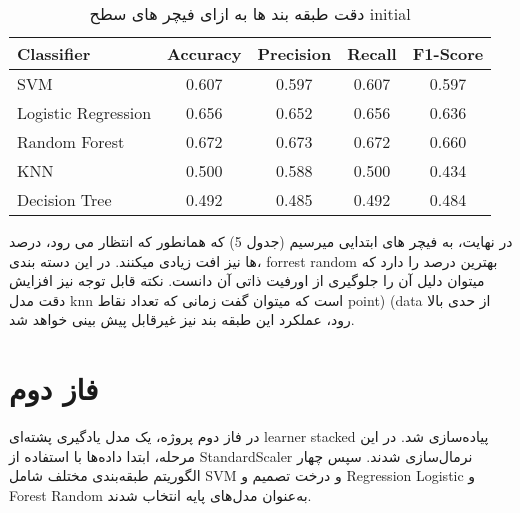 \documentclass[a4paper,12pt]{article}
\begin{document}
\begin{table}[h]
	\centering
	\begin{latin}
	\begin{tabular}{|l|c|c|c|c|}
		\hline
		\textbf{Classifier} & \textbf{Accuracy} & \textbf{Precision} & \textbf{Recall} & \textbf{F1-Score} \\
		\hline
		SVM & 0.607 & 0.597 & 0.607 & 0.597 \\
		\hline
		Logistic Regression & 0.656 & 0.652 & 0.656 & 0.636 \\
		\hline
		Random Forest & 0.672 & 0.673 & 0.672 & 0.660 \\
		\hline
		KNN & 0.500 & 0.588 & 0.500 & 0.434 \\
		\hline
		Decision Tree & 0.492 & 0.485 & 0.492 & 0.484 \\
		\hline
	\end{tabular}
	\end{latin}
	\caption{دقت طبقه بند ها به ازای فیچر های سطح initial}
	\label{tab:classifier_performance_3}
\end{table}

در نهایت، به فیچر های ابتدایی میرسیم (جدول 5) که همانطور که انتظار می رود، درصد ها نیز افت زیادی میکنند. در این دسته بندی، forrest random بهترین درصد را دارد که میتوان دلیل آن را جلوگیری از اورفیت ذاتی آن دانست. نکته قابل توجه نیز افزایش دقت مدل knn است که میتوان گفت زمانی که تعداد نقاط point) (data از حدی بالا رود، عملکرد این طبقه بند نیز غیرقابل پیش بینی خواهد شد. 


\section{فاز دوم}
در فاز دوم پروژه، یک مدل یادگیری پشته‌ای
 learner stacked
 پیاده‌سازی شد. در این مرحله، ابتدا داده‌ها با استفاده از 
  StandardScaler
  نرمال‌سازی شدند. سپس چهار الگوریتم طبقه‌بندی مختلف شامل SVM و درخت تصمیم
   و  
  Regression Logistic  و
  Forest Random  
   به‌عنوان مدل‌های پایه انتخاب شدند.
   
\end{document}
